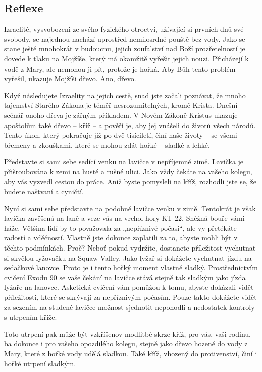 \documentclass[11pt]{article}
\begin{document}
\subsection*{Reflexe}
Izraelité, vysvobozeni ze svého fyzického otroctví, užívající si prvních dnů své svobody, se najednou nachází uprostřed
nemilosrdné pouště bez vody. Jako se stane ještě mnohokrát v budoucnu, jejich zoufalství nad Boží prozřetelností je
dovede k tlaku na Mojžíše, který má okamžitě vyřešit jejich nouzi. Přicházejí k vodě z Mary, ale nemohou ji pít,
protože je hořká. Aby Bůh tento problém vyřešil, ukazuje Mojžíši dřevo. Ano, dřevo.

Když následujete Izraelity na jejich cestě, snad jste začali poznávat, že mnoho tajemství Starého Zákona je téměř
nesrozumitelných, kromě Krista. Dnešní scénář onoho dřeva je zářným příkladem. V Novém Zákoně Kristus ukazuje
apoštolům také dřevo – kříž – a pověří je, aby jej vnášeli do životů všech národů. Tento úkon, který pokračuje již po
dvě tisíciletí, činí naše životy – se všemi břemeny a zkouškami, které se mohou zdát hořké – sladké a lehké.

Představte si sami sebe sedící venku na lavičce v nepříjemné zimě. Lavička je přišroubována k zemi na husté a rušné
ulici. Jako vždy čekáte na vašeho kolegu, aby vás vyzvedl cestou do práce. Aniž byste pomysleli na kříž, rozhodli jste
se, že budete naštvaní a cyničtí.

Nyní si sami sebe představte na podobné lavičce venku v zimě. Tentokrát je však lavička zavěšená na laně a veze vás
na vrchol hory KT-22. Sněžná bouře vámi háže. Většina lidí by to považovala za „nepříznivé počasí“, ale vy přetékáte
radostí a vděčností. Vlastně jste dokonce zaplatili za to, abyste mohli být v těchto podmínkách. Proč? Neboť pokud
vydržíte, dostanete příležitost vychutnat si skvělou lyžovačku na Squaw Valley. Jako lyžař si dokážete vychutnat jízdu
na sedačkové lanovce. Proto je i tento hořký moment vlastně sladký.
Prostřednictvím cvičení Exodu 90 se vaše čekání na lavičce stává stejně tak sladkým jako jízda lyžaře na lanovce.
Asketická cvičení vám pomůžou k tomu, abyste dokázali vidět příležitosti, které se skrývají za nepříznivým počasím.
Pouze takto dokážete vidět za sezením na studené lavičce možnost sjednotit nepohodlí a nedostatek kontroly
s utrpením kříže.

Toto utrpení pak může být vzkříšenov modlitbě skrze kříž, pro vás, vaši rodinu, ba dokonce i pro vašeho opozdilého
kolegu, stejně jako dřevo hozené do vody z Mary, které z hořké vody udělá sladkou. Také kříž, vhozený do
protivenství, činí i hořké utrpení sladkým.
\end{document}
